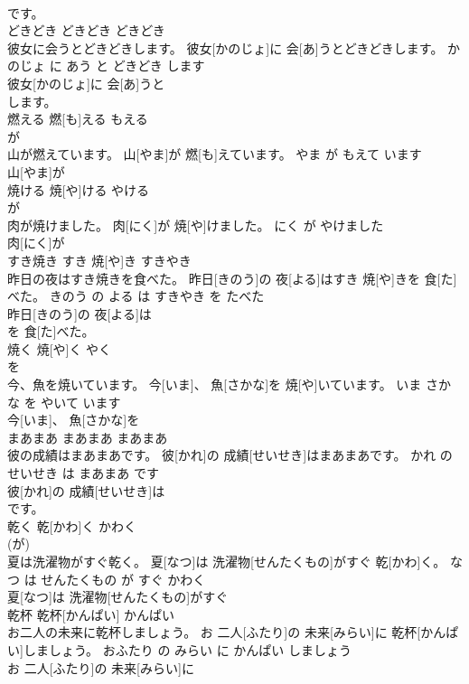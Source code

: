 \documentclass[8pt]{extreport}
\begin{document}
\begin{CJK}{UTF8}{min}
\\	です。		
\\	どきどき	どきどき	どきどき	
\\	彼女に会うとどきどきします。	彼女[かのじょ]に 会[あ]うとどきどきします。	かのじょ に あう と どきどき します	
\\	彼女[かのじょ]に 会[あ]うと
\\	します。		
\\	燃える	燃[も]える	もえる	
\\	が		
\\	山が燃えています。	山[やま]が 燃[も]えています。	やま が もえて います	
\\	山[やま]が
\\	焼ける	焼[や]ける	やける	
\\	が		
\\	肉が焼けました。	肉[にく]が 焼[や]けました。	にく が やけました	
\\	肉[にく]が
\\	すき焼き	すき 焼[や]き	すきやき	
\\	昨日の夜はすき焼きを食べた。	昨日[きのう]の 夜[よる]はすき 焼[や]きを 食[た]べた。	きのう の よる は すきやき を たべた	
\\	昨日[きのう]の 夜[よる]は
\\	を 食[た]べた。		
\\	焼く	焼[や]く	やく	
\\	を		
\\	今、魚を焼いています。	今[いま]、 魚[さかな]を 焼[や]いています。	いま さかな を やいて います	
\\	今[いま]、 魚[さかな]を
\\	まあまあ	まあまあ	まあまあ	
\\	彼の成績はまあまあです。	彼[かれ]の 成績[せいせき]はまあまあです。	かれ の せいせき は まあまあ です	
\\	彼[かれ]の 成績[せいせき]は
\\	です。		
\\	乾く	乾[かわ]く	かわく	
\\	(が)		
\\	夏は洗濯物がすぐ乾く。	夏[なつ]は 洗濯物[せんたくもの]がすぐ 乾[かわ]く。	なつ は せんたくもの が すぐ かわく	
\\	夏[なつ]は 洗濯物[せんたくもの]がすぐ
\\	乾杯	乾杯[かんぱい]	かんぱい	
\\	お二人の未来に乾杯しましょう。	お 二人[ふたり]の 未来[みらい]に 乾杯[かんぱい]しましょう。	おふたり の みらい に かんぱい しましょう	
\\	お 二人[ふたり]の 未来[みらい]に

\end{CJK}
\end{document}

